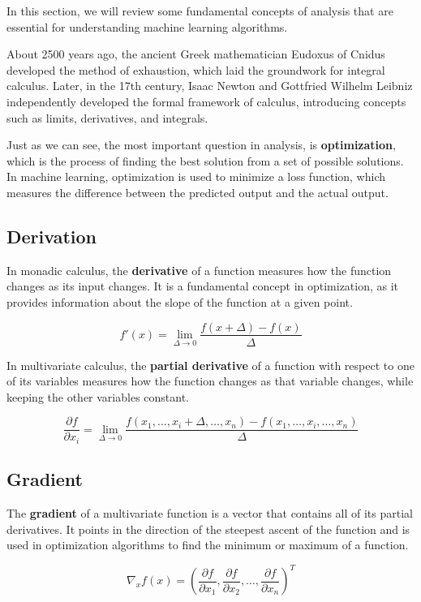 In this section, we will review some fundamental concepts of analysis that are essential for understanding machine learning algorithms.

About 2500 years ago, the ancient Greek mathematician Eudoxus of Cnidus developed the method of exhaustion, which laid the groundwork for integral calculus. Later, in the 17th century, Isaac Newton and Gottfried Wilhelm Leibniz independently developed the formal framework of calculus, introducing concepts such as limits, derivatives, and integrals.

Just as we can see, the most important question in analysis, is \textbf{optimization}, which is the process of finding the best solution from a set of possible solutions. In machine learning, optimization is used to minimize a loss function, which measures the difference between the predicted output and the actual output.

\subsection{Derivation}

In monadic calculus, the \textbf{derivative} of a function measures how the function changes as its input changes. It is a fundamental concept in optimization, as it provides information about the slope of the function at a given point.

\[
f'(x) = \lim_{\Delta \to 0} \frac{f(x+\Delta)-f(x)}{\Delta}
\]

In multivariate calculus, the \textbf{partial derivative} of a function with respect to one of its variables measures how the function changes as that variable changes, while keeping the other variables constant.

\[
\frac{\partial f}{\partial x_i} = \lim_{\Delta \to 0} \frac{f(x_1, \ldots, x_i + \Delta, \ldots, x_n) - f(x_1, \ldots, x_i, \ldots, x_n)}{\Delta}
\]

\subsection{Gradient}

The \textbf{gradient} of a multivariate function is a vector that contains all of its partial derivatives. It points in the direction of the steepest ascent of the function and is used in optimization algorithms to find the minimum or maximum of a function.

\[
\nabla_x f(x) = \left( \frac{\partial f}{\partial x_1}, \frac{\partial f}{\partial x_2}, \ldots, \frac{\partial f}{\partial x_n} \right)^T
\]

